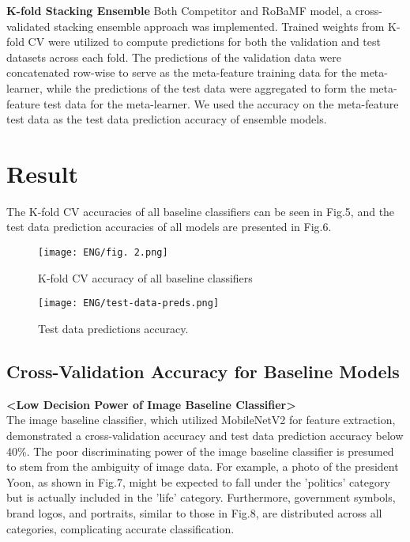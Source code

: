 \documentclass{article}
\begin{document}
\textbf{K-fold Stacking Ensemble}\quad
Both Competitor and RoBaMF model, a cross-validated stacking ensemble approach was implemented. Trained weights from K-fold CV were utilized to compute predictions for both the validation and test datasets across each fold. The predictions of the validation data were concatenated row-wise to serve as the meta-feature training data for the meta-learner, while the predictions of the test data were aggregated to form the meta-feature test data for the meta-learner. We used the accuracy on the meta-feature test data as the test data prediction accuracy of ensemble models.

\section{Result}
The K-fold CV accuracies of all baseline classifiers can be seen in Fig.5, and the test data prediction accuracies of all models are presented in Fig.6.

\begin{figure}[ht]
    \centering
    \begin{minipage}{0.48\textwidth}
        \centering
        \texttt{[image: ENG/fig. 2.png]} %
        \caption{K-fold CV accuracy of all baseline classifiers}
        \label{fig.5}
    \end{minipage}\hfill
    \begin{minipage}{0.48\textwidth}
        \centering
        \texttt{[image: ENG/test-data-preds.png]} %
        \caption{Test data predictions accuracy.}
        \label{fig.6}
    \end{minipage}
\end{figure}



\subsection{Cross-Validation Accuracy for Baseline Models}
\textbf{<Low Decision Power of Image Baseline Classifier>} \\
The image baseline classifier, which utilized MobileNetV2 for feature extraction, demonstrated a cross-validation accuracy and test data prediction accuracy below 40\%. The poor discriminating power of the image baseline classifier is presumed to stem from the ambiguity of image data. For example, a photo of the president Yoon, as shown in Fig.7, might be expected to fall under the 'politics' category but is actually included in the 'life' category. Furthermore, government symbols, brand logos, and portraits, similar to those in Fig.8, are distributed across all categories, complicating accurate classification.
\end{document}
